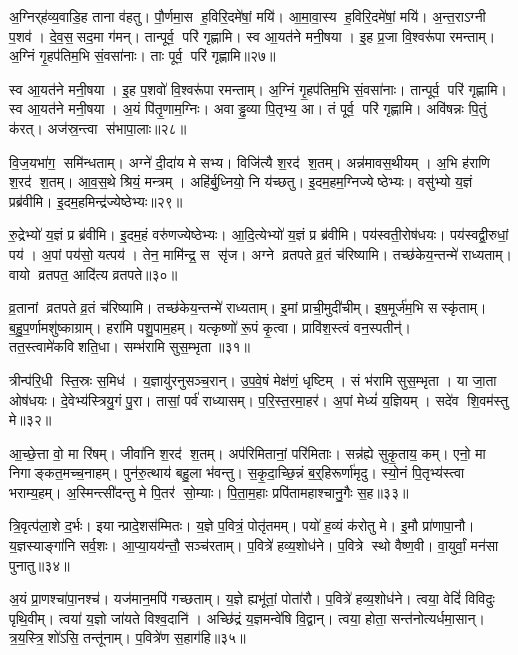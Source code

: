 अ॒ग्निर्‌ह॑व्य॒वाडि॒ह ताना व॑हतु।
पौ॒र्णमा॒स ह॒विरि॒दमे॑षां॒ मयि॑।
आ॒मा॒वा॒स्य ह॒विरि॒दमे॑षां॒ मयि॑।
अ॒न्त॒राऽग्नी प॒शव॑।
दे॒व॒स॒सद॒मा ग॑मन्।
तान्पूर्व॒ परि॑ गृह्णामि।
स्व आ॒यत॑ने मनी॒षया।
इ॒ह प्र॒जा वि॒श्वरू॑पा रमन्ताम्।
अ॒ग्निं गृ॒हप॑तिम॒भि सं॒वसा॑नाः।
ताः पूर्व॒ परि॑ गृह्णामि॥२७॥

स्व आ॒यत॑ने मनी॒षया।
इ॒ह प॒शवो॑ वि॒श्वरू॑पा रमन्ताम्।
अ॒ग्निं गृ॒हप॑तिम॒भि सं॒वसा॑नाः।
तान्पूर्व॒ परि॑ गृह्णामि।
स्व आ॒यत॑ने मनी॒षया।
अ॒यं पि॑तृ॒णाम॒ग्निः।
अवाड्ढ॒व्या पि॒तृभ्य॒ आ।
तं पूर्व॒ परि॑ गृह्णामि।
अवि॑षन्नः पि॒तुं क॑रत्।
अज॑स्र॒न्त्वा स॑भापा॒लाः॥२८॥

वि॒ज॒यभा॑ग॒ समि॑न्धताम्।
अग्ने॑ दी॒दा॑य मे सभ्य।
विजि॑त्यै श॒रद॑ श॒तम्।
अन्न॑मावस॒थीयम्।
अ॒भि ह॑राणि श॒रद॑ श॒तम्।
आ॒व॒स॒थे श्रियं॒ मन्त्रम्।
अहि॑र्बु॒ध्नियो॒ नि य॑च्छतु।
इ॒दम॒हम॒ग्निज्येष्ठेभ्यः।
वसु॑भ्यो य॒ज्ञं प्रब्र॑वीमि।
इ॒दम॒हमिन्द्र॑ज्येष्ठेभ्यः॥२९॥

रु॒द्रेभ्यो॑ य॒ज्ञं प्र ब्र॑वीमि।
इ॒दम॒हं वरु॑णज्येष्ठेभ्यः।
आ॒दि॒त्येभ्यो॑ य॒ज्ञं प्र ब्र॑वीमि।
पय॑स्वती॒रोष॑धयः।
पय॑स्वद्वी॒रुधां॒ पय॑।
अ॒पां पय॑सो॒ यत्पय॑।
तेन॒ मामि॑न्द्र॒ स सृ॑ज।
अग्ने व्रतपते व्र॒तं च॑रिष्यामि।
तच्छ॑केय॒न्तन्मे॑ राध्यताम्।
वायो व्रतपत॒ आदि॑त्य व्रतपते॥३०॥

व्र॒तानां व्रतपते व्र॒तं च॑रिष्यामि।
तच्छ॑केय॒न्तन्मे॑ राध्यताम्।
इ॒मां प्राची॒मुदी॑चीम्।
इष॒मूर्ज॑म॒भि सस्कृ॑ताम्।
ब॒हु॒प॒र्णामशु॑ष्काग्राम्।
हरा॑मि पशु॒पाम॒हम्।
यत्कृष्णो॑ रू॒पं कृ॒त्वा।
प्रावि॑श॒स्त्वं वन॒स्पतीन्॑।
तत॒स्त्वामे॑कविशति॒धा।
सम्भ॑रामि सुस॒म्भृता॥३१॥

त्रीन्प॑रि॒धी स्ति॒स्रः स॒मिध॑।
य॒ज्ञायु॑रनुसञ्च॒रान्।
उ॒प॒वे॒षं मेक्ष॑णं॒ धृष्टिम्।
सं भ॑रामि सुस॒म्भृता।
या जा॒ता ओष॑धयः।
दे॒वेभ्य॑स्त्रियु॒गं पु॒रा।
तासां॒ पर्व॑ राध्यासम्।
प॒रि॒स्त॒रमा॒हर\sn{}॑।
अ॒पां मेध्यं॑ य॒ज्ञियम्।
सदे॑व शि॒वम॑स्तु मे॥३२॥

आ॒च्छे॒त्ता वो॒ मा रि॑षम्।
जीवा॑नि श॒रद॑ श॒तम्।
अप॑रिमितानां॒ परि॑मिताः।
सन्न॑ह्ये सुकृ॒ताय॒ कम्।
एनो॒ मा निगाङ्कत॒मच्च॒नाहम्।
पुन॑रु॒त्थाय॑ बहु॒ला भ॑वन्तु।
स॒कृ॒दा॒च्छि॒न्नं ब॒र्॒हिरूर्णा॑मृदु।
स्यो॒नं पि॒तृभ्य॑स्त्वा भराम्य॒हम्।
अ॒स्मिन्त्सी॑दन्तु मे पि॒तर॑ सो॒म्याः।
पि॒ता॒म॒हाः प्रपि॑तामहाश्चानु॒गैः स॒ह॥३३॥

त्रि॒वृत्प॑ला॒शे द॒र्भः।
इयान्प्रादे॒शस॑म्मितः।
य॒ज्ञे प॒वित्रं॒ पोतृ॑तमम्।
पयो॑ ह॒व्यं क॑रोतु मे।
इ॒मौ प्रा॑णापा॒नौ।
य॒ज्ञस्याङ्गा॑नि सर्व॒शः।
आ॒प्या॒यय॑न्तौ॒ सञ्च॑रताम्।
प॒वित्रे॑ हव्य॒शोध॑ने।
प॒वित्रे स्थो वैष्ण॒वी।
वा॒युर्वां॒ मन॑सा पुनातु॥३४॥

अ॒यं प्रा॒णश्चा॑पा॒नश्च॑।
यज॑मान॒मपि॑ गच्छताम्।
य॒ज्ञे ह्यभू॑तां॒ पोता॑रौ।
प॒वित्रे॑ हव्य॒शोध॑ने।
त्वया॒ वेदिं॑ विविदुः पृथि॒वीम्।
त्वया॑ य॒ज्ञो जा॑यते विश्व॒दानि॑।
अच्छि॑द्रं य॒ज्ञमन्वे॑षि वि॒द्वान्।
त्वया॒ होता॒ सन्त॑नोत्यर्धमा॒सान्।
त्र॒य॒स्त्रि॒शो॑ऽसि॒ तन्तू॑नाम्।
प॒वित्रे॑ण स॒हाग॑हि॥३५॥

